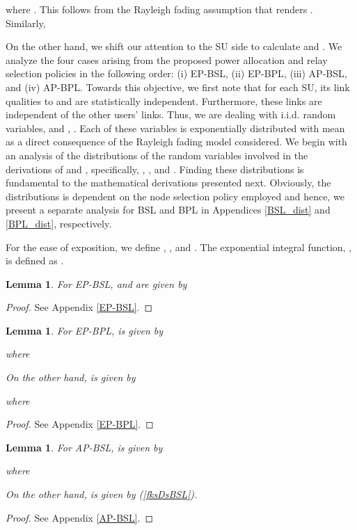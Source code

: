 \documentclass[journal,twocolumn]{IEEEtran}
\newtheorem{lemma}[theorem]{Lemma}
\begin{document}
where . This follows from the Rayleigh fading assumption that renders . Similarly,



On the other hand, we shift our attention to the SU side to calculate  and . We analyze the four cases arising from the proposed power allocation and relay selection policies in the following order: (i) EP-BSL, (ii) EP-BPL, (iii) AP-BSL, and (iv) AP-BPL. 
Towards this objective, we first note that for each SU, its link qualities to  and  are statistically independent. Furthermore, these links are independent of the other  users' links. Thus, we are dealing with  i.i.d. random variables,  and , . Each of these variables is exponentially distributed with mean  as a direct consequence of the Rayleigh fading model considered. We begin with an analysis of the distributions of the random variables involved in the derivations of  and , specifically, , , and . Finding these distributions is fundamental to the mathematical derivations presented next. Obviously, the distributions is dependent on the node selection policy employed and hence, we present a separate analysis for BSL and BPL in Appendices \ref{BSL_dist} and \ref{BPL_dist}, respectively.

For the ease of exposition, we define , , and . The exponential integral function, , is defined as .
\begin{lemma}\label{lemma2}
For EP-BSL,  and  are given by

\end{lemma}
\begin{proof}
See Appendix \ref{EP-BSL}.
\end{proof}

\begin{lemma}\label{lemma3}
For EP-BPL,  is given by
 
where

On the other hand,  is given by

where

\end{lemma}
\begin{proof}
See Appendix \ref{EP-BPL}.
\end{proof}

\begin{lemma}\label{lemma4}
For AP-BSL,  is given by

where

On the other hand,  is given by (\ref{fksDsBSL}).
\end{lemma}
\begin{proof}
See Appendix \ref{AP-BSL}.
\end{proof}
\end{document}
